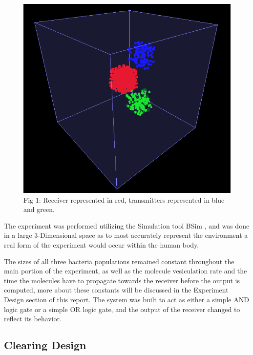 \documentclass[conference]{IEEEtran}
\begin{document}
\begin{figure}
\includegraphics[width=\linewidth]{System.png}
\caption{Fig 1: Receiver represented in red, transmitters represented in blue and green.}
\end{figure}

The experiment was performed utilizing the Simulation tool BSim \cite{b1}, and was done in a large 3-Dimensional space as to most accurately represent the environment a real form of the experiment would occur within the human body.
\\
\par
The sizes of all three bacteria populations remained constant throughout the main portion of the experiment, as well as the molecule vesiculation rate and the time the molecules have to propagate towards the receiver before the output is computed, more about these constants will be discussed in the Experiment Design section of this report. The system was built to act as either a simple AND logic gate or a simple OR logic gate, and the output of the receiver changed to reflect its behavior.

\subsection{Clearing Design}
\end{document}
